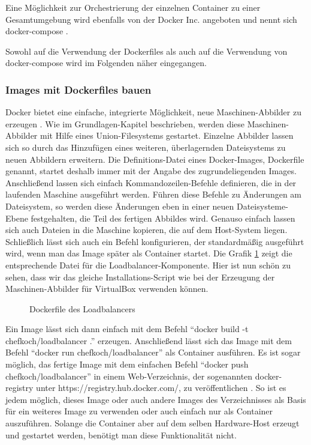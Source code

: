 Eine Möglichkeit zur Orchestrierung der einzelnen Container zu einer Gesamtumgebung wird ebenfalls von der Docker Inc. angeboten und nennt sich docker-compose \citep[Vgl.][]{dockercompose}.

Sowohl auf die Verwendung der Dockerfiles als auch auf die Verwendung von docker-compose wird im Folgenden näher eingegangen.

\subsubsection{Images mit Dockerfiles bauen}

Docker bietet eine einfache, integrierte Möglichkeit, neue Maschinen-Abbilder zu erzeugen \citep[Vgl.][]{docker:003}. Wie im Grundlagen-Kapitel beschrieben, werden diese Maschinen-Abbilder mit Hilfe eines Union-Filesystems gestartet. Einzelne Abbilder lassen sich so durch das Hinzufügen eines weiteren, überlagernden Dateisystems zu neuen Abbildern erweitern. Die Definitions-Datei eines Docker-Images, Dockerfile genannt, startet deshalb immer mit der Angabe des zugrundeliegenden Images. Anschließend lassen sich einfach Kommandozeilen-Befehle definieren, die in der laufenden Maschine ausgeführt werden. Führen diese Befehle zu Änderungen am Dateisystem, so werden diese Änderungen eben in einer neuen Dateisysteme-Ebene festgehalten, die Teil des fertigen Abbildes wird. Genauso einfach lassen sich auch Dateien in die Maschine kopieren, die auf dem Host-System liegen. Schließlich lässt sich auch ein Befehl konfigurieren, der standardmäßig ausgeführt wird, wenn man das Image später als Container startet. Die Grafik \ref{loadbalancer-dockerfile} zeigt die entsprechende Datei für die Loadbalancer-Komponente. Hier ist nun schön zu sehen, dass wir das gleiche Installations-Script wie bei der Erzeugung der Maschinen-Abbilder für VirtualBox verwenden können.

\begin{figure}[!ht]
  \begin{center}
    \caption{Dockerfile des Loadbalancers}
    \label{loadbalancer-dockerfile}
  \end{center}
\end{figure}

Ein Image lässt sich dann einfach mit dem Befehl "`docker build -t chefkoch/loadbalancer ."' erzeugen. Anschließend lässt sich das Image mit dem Befehl "`docker run chefkoch/loadbalancer"' als Container ausführen. Es ist sogar möglich, das fertige Image mit dem einfachen Befehl "`docker push chefkoch/loadbalancer"' in einem Web-Verzeichnis, der sogenannten docker-registry unter https://registry.hub.docker.com/, zu veröffentlichen \citep[Vgl][]{docker:004}. So ist es jedem möglich, dieses Image oder auch andere Images des Verzeichnisses als Basis für ein weiteres Image zu verwenden oder auch einfach nur als Container auszuführen. Solange die Container aber auf dem selben Hardware-Host erzeugt und gestartet werden, benötigt man diese Funktionalität nicht.

